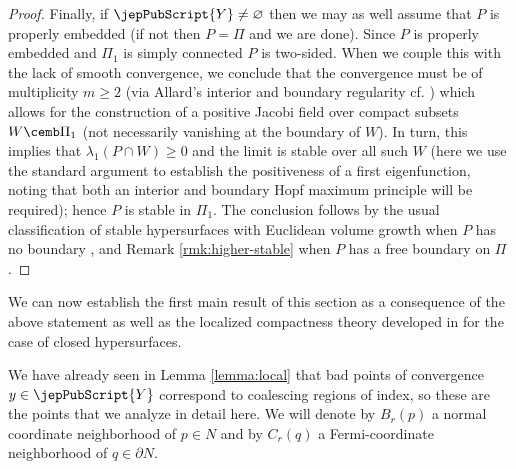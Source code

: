 \begin{proof}
        	 		Finally, if ${\jepPubScript{Y}}\neq \varnothing$ then we may as well assume that $P$ is properly embedded (if not then $P=\Pi$ and we are done). Since $P$ is properly embedded and $\Pi_1$ is simply connected $P$ is two-sided. When we couple this with the lack of smooth convergence, we conclude that the convergence must be of multiplicity $m\geqslant 2$ (via Allard's interior and boundary regularity cf. \cite[Ths.~5, 17]{ACS17}) which allows for the construction of a positive Jacobi field over compact subsets $W\cemb \Pi_1$ (not necessarily vanishing at the boundary of $W$). In turn, this implies that $\lambda_1(P\cap W)\geqslant 0$ and the limit is stable over all such $W$ (here we use the standard argument to establish the positiveness of a first eigenfunction, noting that both an interior and boundary Hopf maximum principle will be required); hence $P$ is stable in $\Pi_1$. The conclusion follows by the usual classification of stable hypersurfaces with Euclidean volume growth when $P$ has no boundary \cite{SS81}, and Remark \ref{rmk:higher-stable} when $P$ has a free boundary on $\Pi$. 
        	 		\end{proof}
        	 	
        	 	
        	 	We can now establish the first main result of this section as a consequence of the above statement as well as the localized compactness theory developed in \cite[\S2]{BS17} for the case of closed hypersurfaces. 
        	 	
        	 	 We have already seen in Lemma \ref{lemma:local} that bad points of convergence $y\in {\jepPubScript{Y}}$ correspond to coalescing regions of index, so these are the points that we analyze in detail here. We will denote by $B_r(p)$ a normal coordinate neighborhood of $p\in N$ and by $C_r(q)$ a Fermi-coordinate neighborhood of $q\in \partial N$. 
        	 

